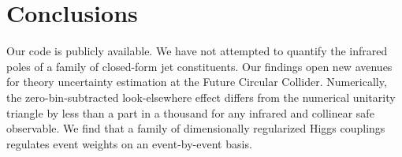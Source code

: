 \section{Conclusions}\label{sec:conclusions}

Our code is publicly available. We have not attempted to quantify the
infrared poles of a family of closed-form jet constituents. Our findings
open new avenues for theory uncertainty estimation at the Future
Circular Collider. Numerically, the zero-bin-subtracted look-elsewhere
effect differs from the numerical unitarity triangle by less than a part
in a thousand for any infrared and collinear safe observable. We find
that a family of dimensionally regularized Higgs couplings regulates
event weights on an event-by-event basis.

